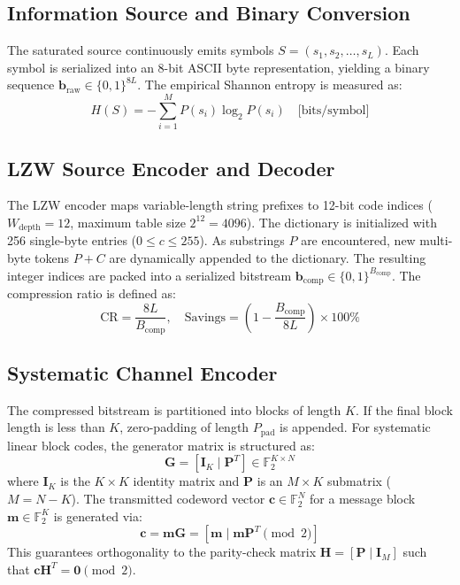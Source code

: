 \documentclass[conference]{IEEEtran}
\begin{document}
\subsection{Information Source and Binary Conversion}
The saturated source continuously emits symbols $S = (s_1, s_2, \dots, s_L)$. Each symbol is serialized into an 8-bit ASCII byte representation, yielding a binary sequence $\mathbf{b}_{\text{raw}} \in \{0, 1\}^{8L}$. The empirical Shannon entropy is measured as:
\begin{equation}
H(S) = - \sum_{i=1}^{M} P(s_i) \log_2 P(s_i) \quad \text{[bits/symbol]}
\end{equation}

\subsection{LZW Source Encoder and Decoder}
The LZW encoder maps variable-length string prefixes to 12-bit code indices ($W_{\text{depth}} = 12$, maximum table size $2^{12} = 4096$). The dictionary is initialized with 256 single-byte entries ($0 \le c \le 255$). As substrings $P$ are encountered, new multi-byte tokens $P+C$ are dynamically appended to the dictionary. The resulting integer indices are packed into a serialized bitstream $\mathbf{b}_{\text{comp}} \in \{0, 1\}^{B_{\text{comp}}}$. The compression ratio is defined as:
\begin{equation}
\text{CR} = \frac{8L}{B_{\text{comp}}}, \quad \text{Savings} = \left(1 - \frac{B_{\text{comp}}}{8L}\right) \times 100\%
\end{equation}

\subsection{Systematic Channel Encoder}
The compressed bitstream is partitioned into blocks of length $K$. If the final block length is less than $K$, zero-padding of length $P_{\text{pad}}$ is appended. For systematic linear block codes, the generator matrix is structured as:
\begin{equation}
\mathbf{G} = [\mathbf{I}_K \mid \mathbf{P}^T] \in \mathbb{F}_2^{K \times N}
\end{equation}
where $\mathbf{I}_K$ is the $K \times K$ identity matrix and $\mathbf{P}$ is an $M \times K$ submatrix ($M = N - K$). The transmitted codeword vector $\mathbf{c} \in \mathbb{F}_2^N$ for a message block $\mathbf{m} \in \mathbb{F}_2^K$ is generated via:
\begin{equation}
\mathbf{c} = \mathbf{m}\mathbf{G} = [\mathbf{m} \mid \mathbf{m}\mathbf{P}^T \pmod 2]
\end{equation}
This guarantees orthogonality to the parity-check matrix $\mathbf{H} = [\mathbf{P} \mid \mathbf{I}_M]$ such that $\mathbf{c}\mathbf{H}^T = \mathbf{0} \pmod 2$.
\end{document}
